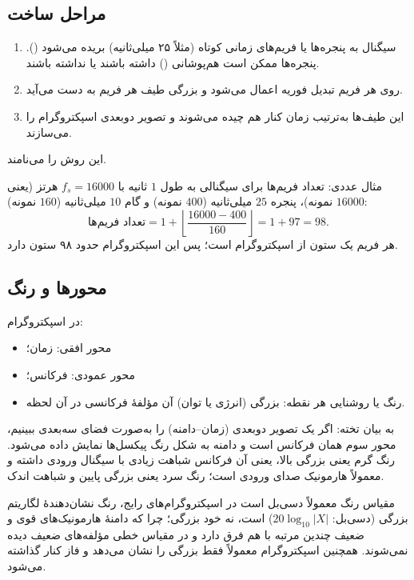 \subsection{مراحل ساخت}
\begin{enumerate}
  \item سیگنال به پنجره‌ها یا فریم‌های زمانی کوتاه (مثلاً ۲۵ میلی‌ثانیه) بریده می‌شود (). پنجره‌ها ممکن است هم‌پوشانی () داشته باشند یا نداشته باشند.
  \item روی هر فریم تبدیل فوریه اعمال می‌شود و بزرگی طیف هر فریم به دست می‌آید.
  \item این طیف‌ها به‌ترتیب زمان کنار هم چیده می‌شوند و تصویر دوبعدی اسپکتروگرام را می‌سازند.
\end{enumerate}
این روش را  می‌نامند.

\begin{addedbox}{مثال عددی: تعداد فریم‌ها}
برای سیگنالی به طول $1$ ثانیه با $f_s=16000$ هرتز (یعنی $16000$ نمونه)، پنجره $25$ میلی‌ثانیه ($400$ نمونه) و گام $10$ میلی‌ثانیه ($160$ نمونه):
\[
\text{تعداد فریم‌ها}=1+\left\lfloor\frac{16000-400}{160}\right\rfloor=1+97=98.
\]
هر فریم یک ستون از اسپکتروگرام است؛ پس این اسپکتروگرام حدود ۹۸ ستون دارد.
\end{addedbox}

\subsection{محورها و رنگ}
در اسپکتروگرام:
\begin{itemize}
  \item محور افقی: زمان؛
  \item محور عمودی: فرکانس؛
  \item رنگ یا روشنایی هر نقطه: بزرگی (انرژی یا توان) آن مؤلفهٔ فرکانسی در آن لحظه.
\end{itemize}
به بیان تخته: اگر یک تصویر دوبعدی (زمان--دامنه) را به‌صورت فضای سه‌بعدی ببینیم، محور سوم همان فرکانس است و دامنه به شکل رنگ پیکسل‌ها نمایش داده می‌شود. رنگ گرم یعنی بزرگی بالا، یعنی آن فرکانس شباهت زیادی با سیگنال ورودی داشته و معمولاً هارمونیک صدای ورودی است؛ رنگ سرد یعنی بزرگی پایین و شباهت اندک.


\begin{correctionbox}{مقیاس رنگ معمولاً دسی‌بل است}
در اسپکتروگرام‌های رایج، رنگ نشان‌دهندهٔ لگاریتم بزرگی (دسی‌بل: $20\log_{10}|X|$) است، نه خود بزرگی؛ چرا که دامنهٔ هارمونیک‌های قوی و ضعیف چندین مرتبه با هم فرق دارد و در مقیاس خطی مؤلفه‌های ضعیف دیده نمی‌شوند. همچنین اسپکتروگرام معمولاً فقط بزرگی را نشان می‌دهد و فاز کنار گذاشته می‌شود.
\end{correctionbox}

